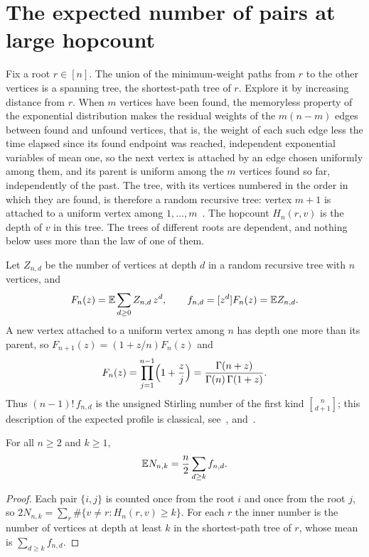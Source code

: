 \section{The expected number of pairs at large hopcount}\label{sec:profile}

Fix a root $r\in[n]$. The union of the minimum-weight paths from $r$ to the other vertices is a spanning tree, the
shortest-path tree of $r$. Explore it by increasing distance from $r$. When $m$ vertices have been found, the
memoryless property of the exponential distribution makes the residual weights of the $m(n-m)$ edges between found
and unfound vertices, that is, the weight of each such edge less the time elapsed since its found endpoint was
reached, independent exponential variables of mean one, so the next vertex is attached by an edge chosen
uniformly among them, and its parent is uniform among the $m$ vertices found so far, independently of the past. The
tree, with its vertices numbered in the order in which they are found, is therefore a random recursive tree: vertex
$m+1$ is attached to a uniform vertex among $1,\dots,m$~\cite{vdHHVM,SM}. The hopcount $H_n(r,v)$ is the depth of $v$
in this tree. The trees of different roots are dependent, and nothing below uses more than the law of one of them.

Let $Z_{n,d}$ be the number of vertices at depth $d$ in a random recursive tree with $n$ vertices, and
\[
F_n(z)=\mathbb{E}\sum_{d\ge0}Z_{n,d}\,z^d,\qquad f_{n,d}=[z^d]F_n(z)=\mathbb{E} Z_{n,d}.
\]
A new vertex attached to a uniform vertex among $n$ has depth one more than its parent, so
$F_{n+1}(z)=(1+z/n)F_n(z)$ and
\begin{equation}\label{eq:F}
F_n(z)=\prod_{j=1}^{n-1}\Bigl(1+\frac zj\Bigr)=\frac{\Gamma(n+z)}{\Gamma(n)\,\Gamma(1+z)} .
\end{equation}
Thus $(n-1)!\,f_{n,d}$ is the unsigned Stirling number of the first kind $\genfrac{[}{]}{0pt}{}{n}{d+1}$; this description of the expected profile is
classical, see~\cite{SM}, \cite[Chapter~6]{Drmota} and~\cite{FHN}.

\begin{lemma}\label{lem:first}
For all $n\ge2$ and $k\ge1$,
\[
\mathbb{E} N_{n,k}=\frac n2\sum_{d\ge k}f_{n,d}.
\]
\end{lemma}

\begin{proof}
Each pair $\{i,j\}$ is counted once from the root $i$ and once from the root $j$, so
$2N_{n,k}=\sum_{r}\#\{v\ne r:H_n(r,v)\ge k\}$. For each $r$ the inner number is the number of vertices at depth at
least $k$ in the shortest-path tree of $r$, whose mean is $\sum_{d\ge k}f_{n,d}$.
\end{proof}

